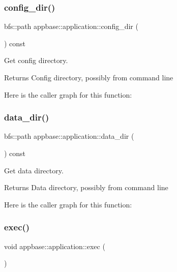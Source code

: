 \subsubsection{\texorpdfstring{config\+\_\+dir()}{config\_dir()}}
{\footnotesize\ttfamily bfs\+::path appbase\+::application\+::config\+\_\+dir (\begin{DoxyParamCaption}{ }\end{DoxyParamCaption}) const}



Get config directory. 

\begin{DoxyReturn}{Returns}
Config directory, possibly from command line 
\end{DoxyReturn}
Here is the caller graph for this function\+:
\mbox{\label{classappbase_1_1application_a5dfd3cfb1124c57963fa17b3f4aabbe1}} 
\subsubsection{\texorpdfstring{data\+\_\+dir()}{data\_dir()}}
{\footnotesize\ttfamily bfs\+::path appbase\+::application\+::data\+\_\+dir (\begin{DoxyParamCaption}{ }\end{DoxyParamCaption}) const}



Get data directory. 

\begin{DoxyReturn}{Returns}
Data directory, possibly from command line 
\end{DoxyReturn}
Here is the caller graph for this function\+:
\mbox{\label{classappbase_1_1application_a39286b0b034b97f6940568a00f44edaf}} 
\subsubsection{\texorpdfstring{exec()}{exec()}}
{\footnotesize\ttfamily void appbase\+::application\+::exec (\begin{DoxyParamCaption}{ }\end{DoxyParamCaption})}

